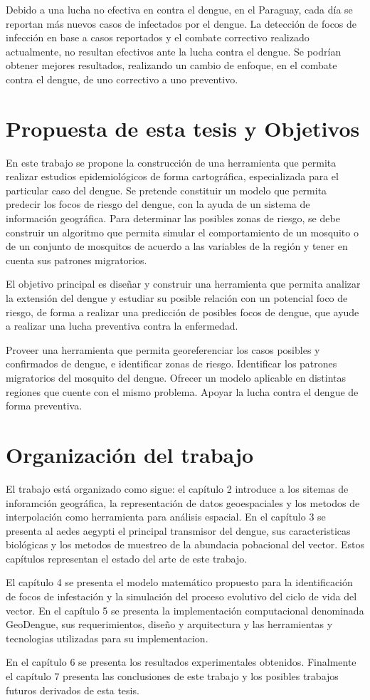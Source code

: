 Debido a una lucha no efectiva en contra el dengue, en  el Paraguay, cada día se reportan más
nuevos casos de infectados por el dengue. La detección de focos de infección en base a casos
reportados y el combate correctivo realizado actualmente, no resultan efectivos ante la lucha
contra el dengue. Se podrían obtener mejores resultados, realizando un cambio de enfoque, en el combate  contra el dengue, de uno correctivo a uno preventivo.

\section{Propuesta de esta tesis y Objetivos}
En este trabajo se propone la construcción de una herramienta que permita realizar estudios
epidemiológicos de forma cartográfica, especializada para el particular caso del dengue. Se
pretende constituir un modelo que permita predecir los focos de riesgo del dengue, con la ayuda de
un sistema de información geográfica. Para determinar las posibles zonas de riesgo, se debe
construir un algoritmo que permita simular el comportamiento de un mosquito o de un conjunto de
mosquitos de acuerdo a las variables de la región y tener en cuenta sus patrones migratorios.

El objetivo principal es diseñar y construir una herramienta que permita analizar la extensión del
dengue y estudiar su posible relación con un potencial foco de riesgo, de forma a realizar una
predicción de posibles focos de dengue, que ayude a realizar una lucha preventiva contra la
enfermedad.

Proveer una herramienta que permita georeferenciar los casos posibles y confirmados de dengue, e identificar zonas de riesgo.
Identificar los patrones migratorios del mosquito del dengue.
Ofrecer un modelo aplicable en distintas regiones que cuente con el mismo problema.
Apoyar la lucha contra el dengue de forma preventiva.

\section{Organización del trabajo}
El trabajo está organizado como sigue: el capítulo 2 introduce a los sitemas de inforamción
geográfica, la representación de datos geoespaciales y los metodos de interpolación como
herramienta para análisis espacial. En el capítulo 3 se presenta al aedes aegypti el principal
transmisor del dengue, sus caracteristicas biológicas y los metodos de muestreo de la abundacia
pobacional del vector. Estos capítulos representan el estado del arte de este trabajo.

El capítulo 4 se presenta el modelo matemático propuesto para la identificación de focos de
infestación y la simulación del proceso evolutivo del ciclo de vida del vector. En el capítulo 5
se presenta la implementación computacional denominada GeoDengue, sus requerimientos, diseño y
arquitectura y las herramientas y tecnologias utilizadas para su implementacion.

En el capítulo 6 se presenta los resultados experimentales obtenidos. Finalmente el capítulo 7
presenta las conclusiones de este trabajo y los  posibles trabajos futuros derivados de esta tesis.
